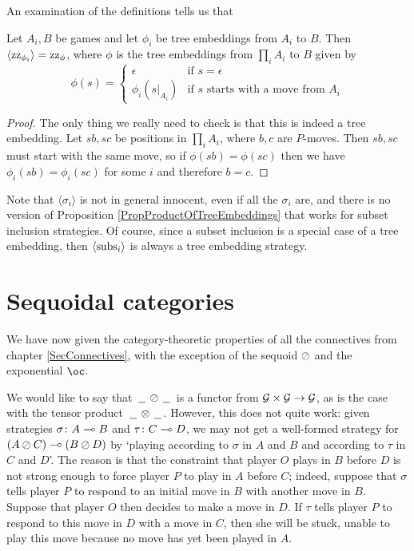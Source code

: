 \documentclass[11pt]{report}
\begin{document}
An examination of the definitions tells us that
\begin{proposition}
  Let $A_i,B$ be games and let $\phi_i$ be tree embeddings from $A_i$ to $B$.  
  Then $\langle \operatorname{zz}_{\phi_i} \rangle = \operatorname{zz}_\phi$, where $\phi$ is the tree embeddings from $\prod_iA_i$ to $B$ given by
  \[
    \phi(s) = \begin{cases}
      \epsilon & \text{if $s=\epsilon$} \\
      \phi_i(s\vert_{A_i}) & \text{if $s$ starts with a move from $A_i$}
    \end{cases}
    \]
  \label{PropProductOfTreeEmbeddings}
\end{proposition}
\begin{proof}
  The only thing we really need to check is that this is indeed a tree embedding.  
  Let $sb,sc$ be positions in $\prod_iA_i$, where $b,c$ are $P$-moves.
  Then $sb,sc$ must start with the same move, so if $\phi(sb)=\phi(sc)$ then we have $\phi_i(sb)=\phi_i(sc)$ for some $i$ and therefore $b=c$.
\end{proof}

Note that $\langle\sigma_i\rangle$ is not in general innocent, even if all the $\sigma_i$ are, and there is no version of Proposition \ref{PropProductOfTreeEmbeddings} that works for subset inclusion strategies.
Of course, since a subset inclusion is a special case of a tree embedding, then $\langle \operatorname{subs}_i\rangle$ is always a tree embedding strategy.

\section{Sequoidal categories}

We have now given the category-theoretic properties of all the connectives from chapter \ref{SecConnectives}, with the exception of the sequoid $\oslash$ and the exponential $\oc$.

We would like to say that $\,\underline{\hspace{1.5ex}}\,\oslash\,\underline{\hspace{1.5ex}}\,$ is a functor from $\mathcal G \times \mathcal G \to \mathcal G$, as is the case with the tensor product $\,\underline{\hspace{1.5ex}}\,\otimes\,\underline{\hspace{1.5ex}}\,$.  
However, this does not quite work: given strategies $\sigma\colon A \multimap B$ and $\tau\colon C \multimap D$, we may not get a well-formed strategy for $(A \oslash C) \multimap (B \oslash D)$ by `playing according to $\sigma$ in $A$ and $B$ and according to $\tau$ in $C$ and $D$'.  
The reason is that the constraint that player $O$ plays in $B$ before $D$ is not strong enough to force player $P$ to play in $A$ before $C$; indeed, suppose that $\sigma$ tells player $P$ to respond to an initial move in $B$ with another move in $B$.  
Suppose that player $O$ then decides to make a move in $D$.  
If $\tau$ tells player $P$ to respond to this move in $D$ with a move in $C$, then she will be stuck, unable to play this move because no move has yet been played in $A$.
\end{document}
